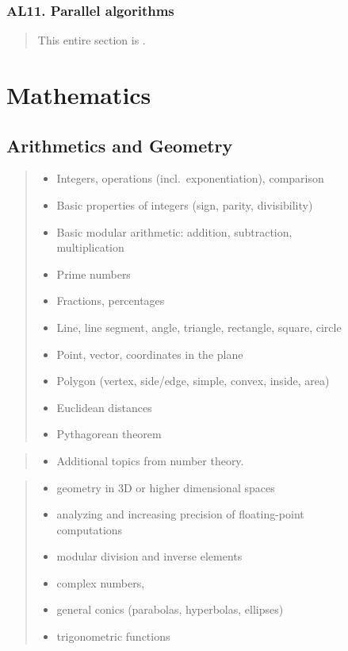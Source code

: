 \documentclass[a4paper,11pt,oneside]{article}
\newcommand{\cmark}{\ding{51}}%
\newcommand{\xmark}{\ding{55}}%
\newcommand{\cincl}{{\small\cmark}}
\newcommand{\cdefi}{{\small\cmark\faFileTextO}}
\newcommand{\ccode}{{\small\cmark\faFileText}}
\newcommand{\cnfoc}{{\small\faQuestion}}
\newcommand{\cemay}{{\small\xmark\faQuestionCircle}}
\newcommand{\cexcl}{{\small\xmark}}
\newcommand{\Iincluded}{\item[\hbox to 1.8em{\cincl\hfill}]}
\newcommand{\Idefine}{\item[\hbox to 1.8em{\cdefi\hfill}]}
\newcommand{\Icodeonly}{\item[\hbox to 1.8em{\ccode\hfill}]}
\newcommand{\Iexmaybe}{\item[\hbox to 1.8em{\cemay\hfill}]}
\newcommand{\Iexcluded}{\item[\hbox to 1.8em{\cexcl\hfill}]}
\newenvironment{myitemize}{\begin{quote}\begin{itemize}\itemsep 0pt}{\end{itemize}\end{quote}}
\begin{document}
    \subsubsection*{AL11. Parallel algorithms}%

    \begin{quote}
    This entire section is \cnfoc.
    \end{quote}



\section {Mathematics}
\label{subsec:mathematics}

\subsection {Arithmetics and Geometry}%
\label{subsubsec:NG}

    \begin{myitemize}
    \Iincluded Integers, operations (incl.\ exponentiation), comparison
    \Iincluded Basic properties of integers (sign, parity, divisibility)
    \Iincluded Basic modular arithmetic: addition, subtraction, \\ multiplication
    \Icodeonly Prime numbers
    \Iincluded Fractions, percentages
    \Iincluded Line, line segment, angle, triangle, rectangle, square, circle
    \Iincluded Point, vector, coordinates in the plane
    \Iincluded Polygon (vertex, side/edge, simple, convex, inside, area)
    \Idefine Euclidean distances
    \Icodeonly Pythagorean theorem
    \end{myitemize}

    \begin{myitemize}
    \Iexmaybe Additional topics from number theory.
    \end{myitemize}
    
    \begin{myitemize}
    \Iexcluded geometry in 3D or higher dimensional spaces
    \Iexcluded analyzing and increasing precision of floating-point \\ computations
    \Iexcluded modular division and inverse elements
    \Iexcluded complex numbers,
    \Iexcluded general conics (parabolas, hyperbolas, ellipses)
    \Iexcluded trigonometric functions
    \end{myitemize}
\end{document}
